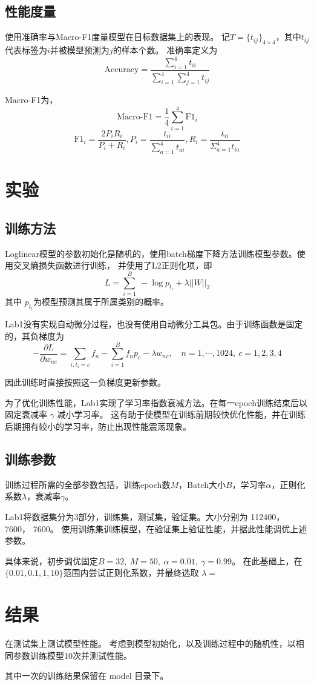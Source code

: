 \documentclass[12pt,letterpaper]{article}
\begin{document}
\subsection{性能度量}
使用准确率与Macro-F1度量模型在目标数据集上的表现。
记$T=\{t_{ij}\}_{4 \times 4}$，其中$t_{ij}$代表标签为$i$并被模型预测为$j$的样本个数。
准确率定义为 
$$\text{Accuracy} = \frac{\sum_{i=1}^4 t_{ii}}{\sum_{i=1}^4\sum_{j=1}^4 t_{ij}}$$

Macro-F1为，
$$\text{Macro-F1} = \frac{1}{4}\sum_{i=1}^4 \text{F1}_i$$
$$\text{F1}_i = \frac{2 P_i R_i}{P_i + R_i}, P_i = \frac{t_{ii}}{\sum_{a=1}^4 t_{ai}}, R_i = \frac{t_{ii}}{\Sigma_{a=1}^4 t_{ia}}$$


\section{实验}
\subsection{训练方法}
Loglinear模型的参数初始化是随机的，使用batch梯度下降方法训练模型参数。使用交叉熵损失函数进行训练，
并使用了L2正则化项，即
$$L = \sum_{i=1}^B \ - \log p_{t_i} + \lambda || W ||_2$$ 
其中 $p_{t_i}$为模型预测其属于所属类别的概率。

Lab1没有实现自动微分过程，也没有使用自动微分工具包。由于训练函数是固定的，其负梯度为
$$ - \frac{\partial L}{\partial w_{nc}} = \sum_{i: t_i = c} f_n - \sum_{i=1}^B f_n p_c  - \lambda w_{nc}, \quad n=1,\cdots,1024, \ c=1,2,3,4$$

因此训练时直接按照这一负梯度更新参数。

为了优化训练性能，Lab1实现了学习率指数衰减方法。在每一epoch训练结束后以固定衰减率 $\gamma$ 减小学习率。
这有助于使模型在训练前期较快优化性能，并在训练后期拥有较小的学习率，防止出现性能震荡现象。

\subsection{训练参数}
训练过程所需的全部参数包括，训练epoch数$M$，Batch大小$B$，学习率$\alpha$，正则化系数$\lambda$，衰减率$\gamma$。

Lab1将数据集分为3部分，训练集，测试集，验证集。大小分别为 112400， 7600， 7600。
使用训练集训练模型，在验证集上验证性能，并据此性能调优上述参数。

具体来说，初步调优固定$B=32,\ M=50,\ \alpha=0.01,\ \gamma=0.99$。
在此基础上，在$\{0.01, 0.1, 1, 10\}$范围内尝试正则化系数，并最终选取 $\lambda=$


\section{结果}
在测试集上测试模型性能。
考虑到模型初始化，以及训练过程中的随机性，以相同参数训练模型10次并测试性能。


其中一次的训练结果保留在 model 目录下。
\end{document}
